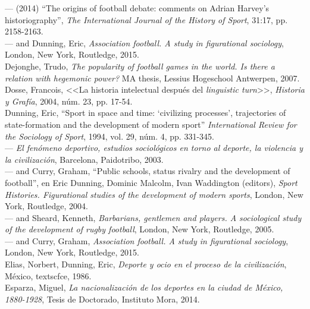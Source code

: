 \documentclass[11pt,a5paper,twoside]{book} %
\begin{document}
\begin{hangparas}{1cm}{1}
\noindent --- (2014) “The origins of football debate: comments on Adrian Harvey’s historiography”, \emph{The International Journal of the History of Sport}, 31:17, pp. 2158-2163. \\

\noindent --- and Dunning, Eric, \emph{Association football. A study in figurational sociology}, London, New York, Routledge, 2015. \\

\noindent Dejonghe, Trudo, \emph{The popularity of football games in the world. Is there a relation with hegemonic power?} MA thesis, Lessius Hogeschool Antwerpen, 2007. \\

\noindent Dosse, Francois, <<La historia intelectual después del \emph{linguistic turn}>>, \emph{Historia y Grafía}, 2004, núm. 23, pp. 17-54. \\

\noindent Dunning, Eric, “Sport in space and time: ‘civilizing processes’, trajectories of state-formation and the development of modern sport” \emph{International Review for the Sociology of Sport}, 1994, vol. 29, núm. 4, pp. 331-345. \\

\noindent --- \emph{El fenómeno deportivo, estudios sociológicos en torno al deporte, la violencia y la civilización}, Barcelona, Paidotribo, 2003. \\

\noindent --- and Curry, Graham, “Public schools, status rivalry and the development of football”, en Eric Dunning, Dominic Malcolm, Ivan Waddington (editors), \emph{Sport Histories. Figurational studies of the development of modern sports}, London, New York, Routledge, 2004. \\

\noindent --- and Sheard, Kenneth, \emph{Barbarians, gentlemen and players. A sociological study of the development of rugby football}, London, New York, Routledge, 2005. \\

\noindent --- and Curry, Graham, \emph{Association football. A study in figurational sociology}, London, New York, Routledge, 2015. \\

\noindent Elias, Norbert, Dunning, Eric, \emph{Deporte y ocio en el proceso de la civilización}, México, textsc{fce}, 1986. \\

\noindent Esparza, Miguel, \emph{La nacionalización de los deportes en la ciudad de México, 1880-1928}, Tesis de Doctorado, Instituto Mora, 2014. \\


\end{hangparas}
\end{document}
